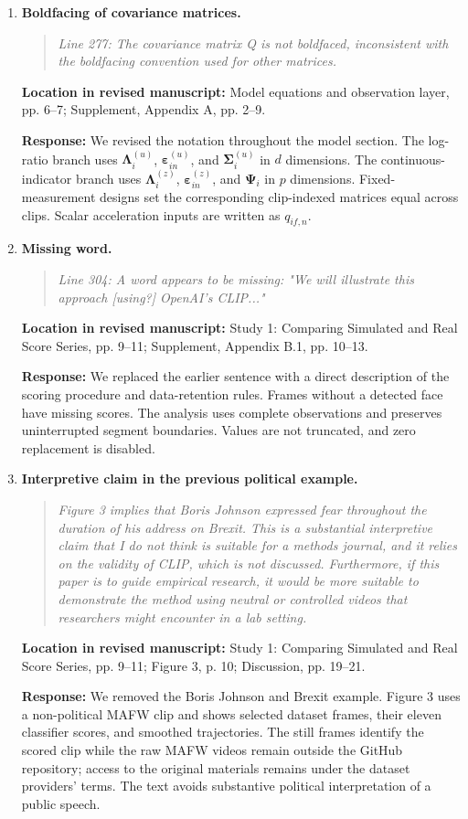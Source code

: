 \documentclass[11pt]{article}
\newenvironment{reviewquote}{\begin{quote}\small\itshape}{\end{quote}}
\newcommand{\point}[1]{\textbf{#1.}}
\newcommand{\location}[1]{\textbf{Location in revised manuscript:} #1\par}
\newcommand{\response}{\textbf{Response:} }
\begin{document}
\begin{enumerate}[resume]
  \item \point{Boldfacing of covariance matrices}
  \begin{reviewquote}
  Line 277: The covariance matrix Q is not boldfaced, inconsistent with the boldfacing convention used for other matrices.
  \end{reviewquote}
  \location{Model equations and observation layer, pp. 6--7; Supplement, Appendix A, pp. 2--9.}
  \response We revised the notation throughout the model section. The log-ratio branch uses \(\boldsymbol{\Lambda}_i^{(u)}\), \(\boldsymbol{\varepsilon}_{in}^{(u)}\), and \(\boldsymbol{\Sigma}_i^{(u)}\) in \(d\) dimensions. The continuous-indicator branch uses \(\boldsymbol{\Lambda}_i^{(z)}\), \(\boldsymbol{\varepsilon}_{in}^{(z)}\), and \(\boldsymbol{\Psi}_i\) in \(p\) dimensions. Fixed-measurement designs set the corresponding clip-indexed matrices equal across clips. Scalar acceleration inputs are written as \(q_{if,n}\).

  \item \point{Missing word}
  \begin{reviewquote}
  Line 304: A word appears to be missing: "We will illustrate this approach [using?] OpenAI's CLIP..."
  \end{reviewquote}
  \location{Study 1: Comparing Simulated and Real Score Series, pp. 9--11; Supplement, Appendix B.1, pp. 10--13.}
  \response We replaced the earlier sentence with a direct description of the scoring procedure and data-retention rules. Frames without a detected face have missing scores. The analysis uses complete observations and preserves uninterrupted segment boundaries. Values are not truncated, and zero replacement is disabled.

  \item \point{Interpretive claim in the previous political example}
  \begin{reviewquote}
  Figure 3 implies that Boris Johnson expressed fear throughout the duration of his address on Brexit. This is a substantial interpretive claim that I do not think is suitable for a methods journal, and it relies on the validity of CLIP, which is not discussed. Furthermore, if this paper is to guide empirical research, it would be more suitable to demonstrate the method using neutral or controlled videos that researchers might encounter in a lab setting.
  \end{reviewquote}
  \location{Study 1: Comparing Simulated and Real Score Series, pp. 9--11; Figure 3, p. 10; Discussion, pp. 19--21.}
  \response We removed the Boris Johnson and Brexit example. Figure 3 uses a non-political MAFW clip and shows selected dataset frames, their eleven classifier scores, and smoothed trajectories. The still frames identify the scored clip while the raw MAFW videos remain outside the GitHub repository; access to the original materials remains under the dataset providers' terms. The text avoids substantive political interpretation of a public speech.


\end{enumerate}
\end{document}
